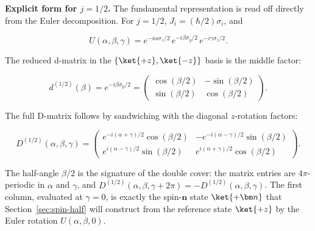 \medskip\noindent\textbf{Explicit form for $j=1/2$.} The fundamental representation is read off directly from the Euler decomposition. For $j=1/2$, $J_i = (\hbar/2)\sigma_i$, and
\begin{linenomath}
    \begin{equation}
        U(\alpha,\beta,\gamma) = e^{-i\alpha\sigma_z/2}\,e^{-i\beta\sigma_y/2}\,e^{-i\gamma\sigma_z/2}.
    \end{equation}
\end{linenomath}
The reduced d-matrix in the $\{\ket{+z},\ket{-z}\}$ basis is the middle factor:
\begin{linenomath}
    \begin{equation}
        d^{(1/2)}(\beta) = e^{-i\beta\sigma_y/2}
        = \begin{pmatrix}
            \cos(\beta/2) & -\sin(\beta/2) \\[2pt]
            \sin(\beta/2) &  \cos(\beta/2)
        \end{pmatrix}.
    \end{equation}
\end{linenomath}
The full D-matrix follows by sandwiching with the diagonal $z$-rotation factors:
\begin{linenomath}
    \begin{equation}
        D^{(1/2)}(\alpha,\beta,\gamma)
        = \begin{pmatrix}
            e^{-i(\alpha+\gamma)/2}\cos(\beta/2) & -e^{-i(\alpha-\gamma)/2}\sin(\beta/2) \\[2pt]
            e^{i(\alpha-\gamma)/2}\sin(\beta/2)  &  e^{i(\alpha+\gamma)/2}\cos(\beta/2)
        \end{pmatrix}.
    \end{equation}
\end{linenomath}
The half-angle $\beta/2$ is the signature of the double cover: the matrix entries are $4\pi$-periodic in $\alpha$ and $\gamma$, and $D^{(1/2)}(\alpha,\beta,\gamma+2\pi) = -D^{(1/2)}(\alpha,\beta,\gamma)$. The first column, evaluated at $\gamma=0$, is exactly the spin-$\bm n$ state $\ket{+\bm n}$ that Section~\ref{sec:spin-half} will construct from the reference state $\ket{+z}$ by the Euler rotation $U(\alpha,\beta,0)$.

